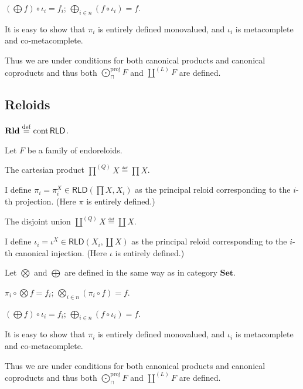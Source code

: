 \begin{obvious}
$\left( \bigoplus f \right) \circ \iota_i = f_i$; $\bigoplus_{i \in n} (f
\circ \iota_i) = f$.
\end{obvious}

It is easy to show that $\pi_i$ is entirely defined monovalued, and $\iota_i$
is metacomplete and co-metacomplete.

Thus we are under conditions for both canonical products and canonical
coproducts and thus both $\bigodot^{\text{proj}}_{\sqcap} F$ and $\coprod^{(L)} F$ are defined.

\subsection{Reloids}

\begin{defn}
  $\mathbf{Rld} \overset{\mathrm{def}}{=} \operatorname{cont} \mathsf{RLD}$.
\end{defn}

Let $F$ be a family of endoreloids.

The cartesian product $\prod^{(Q)} X \eqdef \prod X$.

I define $\pi_i = \pi^X_i \in \mathsf{RLD} \left( \prod X , X_i
\right)$ as the principal reloid corresponding to the $i$-th projection. (Here
$\pi$ is entirely defined.)

The disjoint union $\coprod^{(Q)} X \eqdef \coprod X$.

I define $\iota_i = \iota^X \in
\mathsf{RLD} \left( X_i , \coprod X \right)$ as the principal reloid
corresponding to the $i$-th canonical injection. (Here $\iota$ is entirely
defined.)

Let $\bigotimes$ and $\bigoplus$ are defined in the same way as in category
$\mathbf{Set}$.

\begin{obvious}
$\pi_i \circ \bigotimes f = f_i$; $\bigotimes_{i \in n} (\pi_i \circ f) =
f$.
\end{obvious}

\begin{obvious}
$\left( \bigoplus f \right) \circ \iota_i = f_i$; $\bigoplus_{i \in n} (f
\circ \iota_i) = f$.
\end{obvious}

It is easy to show that $\pi_i$ is entirely defined monovalued, and $\iota_i$
is metacomplete and co-metacomplete.

Thus we are under conditions for both canonical products and canonical
coproducts and thus both $\bigodot^{\text{proj}}_{\sqcap} F$ and $\coprod^{(L)} F$ are defined.

